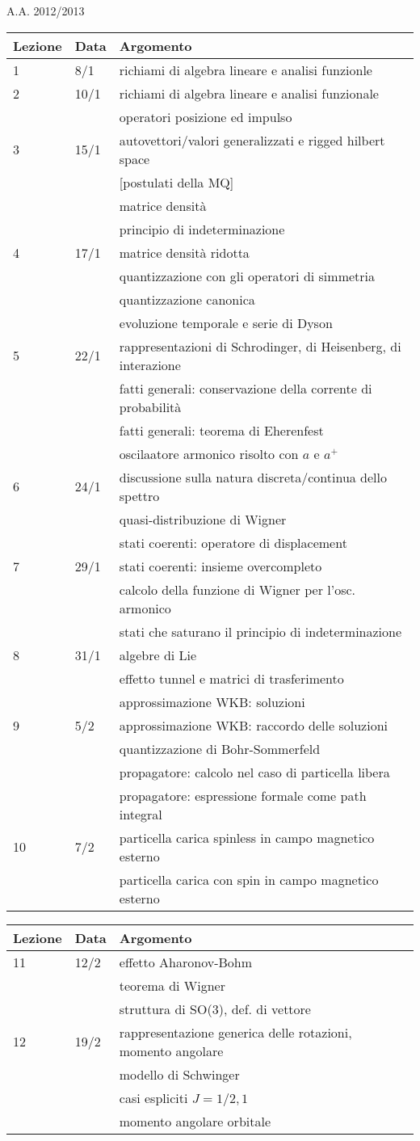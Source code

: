 \documentclass[a4paper, 12pt]{article}
\newcommand{\nl}{\\ & & }
\newcommand{\nr}{\\ \midrule}
\begin{document}
 

\begin{section}{A.A. 2012/2013}
\begin{tabular}{lll}
\toprule
Lezione & Data & Argomento\nr

1 & 8/1 & richiami di algebra lineare e analisi funzionle\nr
 
2 & 10/1 & richiami di algebra lineare e analisi funzionale \nl operatori posizione ed impulso\nr

3 & 15/1 & autovettori/valori generalizzati e rigged hilbert space \nl [postulati della MQ] \nl matrice densità \nl principio di indeterminazione\nr

4 & 17/1 & matrice densità ridotta \nl quantizzazione con gli operatori di simmetria \nl quantizzazione canonica \nl evoluzione temporale e serie di Dyson\nr

5 & 22/1 & rappresentazioni di Schrodinger, di Heisenberg, di interazione \nl fatti generali: conservazione della corrente di probabilità \nl fatti generali: teorema di Eherenfest \nl oscilaatore armonico risolto con $a$ e $a^+$ \nr

6 & 24/1 & discussione sulla natura discreta/continua dello spettro\nl quasi-distribuzione di Wigner \nl stati coerenti: operatore di displacement \nr

7 & 29/1 & stati coerenti: insieme overcompleto \nl calcolo della funzione di Wigner per l'osc. armonico \nl stati che saturano il principio di indeterminazione \nr

8 & 31/1 & algebre di Lie \nl effetto tunnel e matrici di trasferimento \nl approssimazione WKB: soluzioni \nr

9 & 5/2 & approssimazione WKB: raccordo delle soluzioni \nl quantizzazione di Bohr-Sommerfeld \nl propagatore: calcolo nel caso di particella libera \nl propagatore: espressione formale come path integral \nr

10 & 7/2 & particella carica spinless in campo magnetico esterno \nl particella carica con spin in campo magnetico esterno \nr

\end{tabular}

\begin{tabular}{lll}
Lezione & Data & Argomento\nr

11 & 12/2 & effetto Aharonov-Bohm \nl teorema di Wigner \nl struttura di SO(3), def. di vettore \nr 

12 & 19/2 & rappresentazione generica delle rotazioni, momento angolare \nl modello di Schwinger \nl casi espliciti $J=1/2,1$ \nl momento angolare orbitale  \nr 


\end{tabular}
\end{section}
\end{document}
